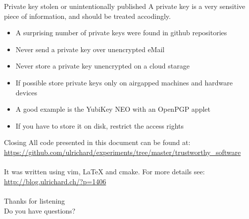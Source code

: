 \documentclass[11pt]{beamer}
\begin{document}
\begin{frame}{Private key stolen or unintentionally published}
A private key is a very sensitive piece of information, and should be treated accodingly.
\\[0.2cm]
\begin{itemize}
\item A surprising number of private keys were found in github repositories
\item Never send a private key over unencrypted eMail %
\item Never store a private key unencrypted on a cloud starage
\item If possible store private keys only on airgapped machines and hardware devices
\item A good example is the YubiKey NEO with an OpenPGP applet
\item If you have to store it on disk, restrict the access rights
\end{itemize}
\end{frame}

\begin{frame}{Closing}
All code presented in this document can be found at:\\
\href{https://github.com/ulrichard/experiments/tree/master/trustworthy\textunderscoresoftware}{https://github.com/ulrichard/experiments/tree/master/trustworthy\_software}\\
\\[0.5cm]
It was written using vim, LaTeX and cmake. For more details see:\\
\href{http://blog.ulrichard.ch/?p=1406}{http://blog.ulrichard.ch/?p=1406}\\
\\[0.5cm]
Thanks for listening
\\[0.5cm]
Do you have questions?
\end{frame}
\end{document}
